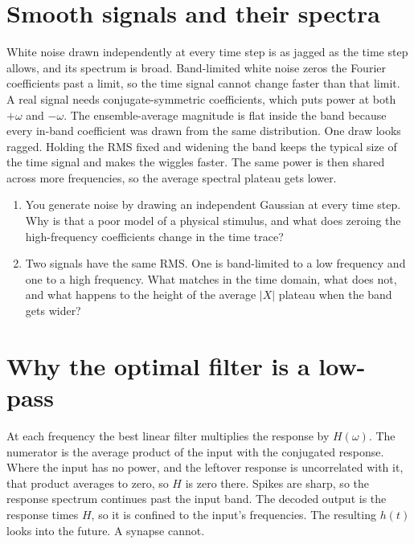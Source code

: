 \documentclass[11pt,letterpaper]{article}
\begin{document}
\section{Smooth signals and their spectra}

\begin{idea}
White noise drawn independently at every time step is as jagged as the time step allows, and its spectrum is broad. Band-limited white noise zeros the Fourier coefficients past a limit, so the time signal cannot change faster than that limit. A real signal needs conjugate-symmetric coefficients, which puts power at both \(+\omega\) and \(-\omega\). The ensemble-average magnitude is flat inside the band because every in-band coefficient was drawn from the same distribution. One draw looks ragged. Holding the RMS fixed and widening the band keeps the typical size of the time signal and makes the wiggles faster. The same power is then shared across more frequencies, so the average spectral plateau gets lower.
\end{idea}

\begin{enumerate}
\item You generate noise by drawing an independent Gaussian at every time step. Why is that a poor model of a physical stimulus, and what does zeroing the high-frequency coefficients change in the time trace?
\item Two signals have the same RMS. One is band-limited to a low frequency and one to a high frequency. What matches in the time domain, what does not, and what happens to the height of the average \(|X|\) plateau when the band gets wider?
\end{enumerate}

\section{Why the optimal filter is a low-pass}

\begin{idea}
At each frequency the best linear filter multiplies the response by \(H(\omega)\). The numerator is the average product of the input with the conjugated response. Where the input has no power, and the leftover response is uncorrelated with it, that product averages to zero, so \(H\) is zero there. Spikes are sharp, so the response spectrum continues past the input band. The decoded output is the response times \(H\), so it is confined to the input's frequencies. The resulting \(h(t)\) looks into the future. A synapse cannot.
\end{idea}
\end{document}
